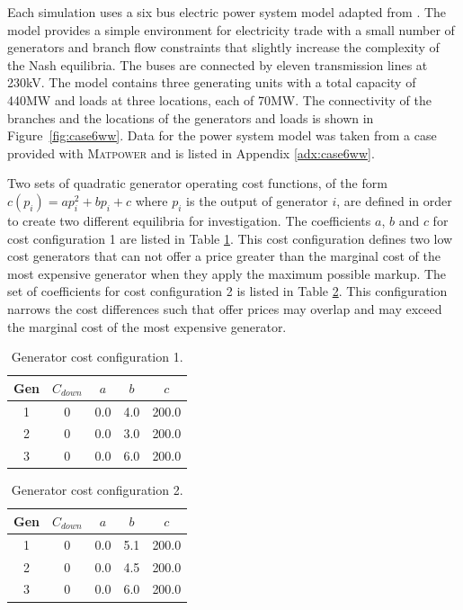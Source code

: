 Each simulation uses a six bus electric power system model adapted from
.  The model provides a simple
environment for electricity trade with a small number of generators and branch
flow constraints that slightly increase the complexity of the Nash equilibria.
The buses are connected by eleven transmission lines at 230kV. The model
contains three generating units with a total capacity of 440MW and loads at
three locations, each of 70MW. The connectivity of the branches and the
locations of the generators and loads is shown in Figure~\ref{fig:case6ww}. Data
for the power system model was taken from a case provided with \textsc{Matpower}
and is listed in Appendix \ref{adx:case6ww}.

Two sets of quadratic generator operating cost functions, of the form
$c(p_i)=ap_i^2+bp_i+c$ where $p_i$ is the output of generator $i$, are defined
in order to create two different equilibria for investigation.  The coefficients
$a$, $b$ and $c$ for cost configuration 1 are listed in Table
\ref{tbl:case6ww_gencost1}.  This cost configuration defines two low cost
generators that can not offer a price greater than the marginal cost of the most
expensive generator when they apply the maximum possible markup. The set of
coefficients for cost configuration 2 is listed in Table
\ref{tbl:case6ww_gencost2}.  This configuration narrows the cost differences
such that offer prices may overlap and may exceed the marginal cost of the most
expensive generator.


\begin{table}
\begin{center}
\begin{tabular}{c|c|c|c|c}
\hline
Gen &$C_{down}$ &$a$ &$b$ &$c$ \\
\hline\hline
 1 &0 &0.0 &4.0 &200.0 \\
 2 &0 &0.0 &3.0 &200.0 \\
 3 &0 &0.0 &6.0 &200.0 \\
\hline
\end{tabular}
\caption{Generator cost configuration 1.}
\label{tbl:case6ww_gencost1}
\end{center}
\end{table}

\begin{table}
\begin{center}
\begin{tabular}{c|c|c|c|c}
\hline
Gen &$C_{down}$ &$a$ &$b$ &$c$ \\
\hline\hline
 1 &0 &0.0 &5.1 &200.0 \\
 2 &0 &0.0 &4.5 &200.0 \\
 3 &0 &0.0 &6.0 &200.0 \\
\hline
\end{tabular}
\caption{Generator cost configuration 2.}
\label{tbl:case6ww_gencost2}
\end{center}
\end{table}

